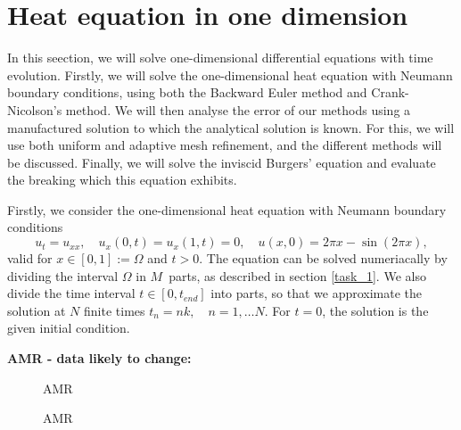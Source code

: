 \section{Heat equation in one dimension}
In this seection, we will solve one-dimensional differential equations with time evolution. 
Firstly, we will solve the one-dimensional heat equation with Neumann boundary conditions, using both the Backward Euler method and Crank-Nicolson's method.
We will then analyse the error of our methods using a manufactured solution to which the analytical solution is known.
For this, we will use both uniform and adaptive mesh refinement, and the different methods will be discussed.
Finally, we will solve the inviscid Burgers' equation and evaluate the breaking which this equation exhibits.

Firstly, we consider the one-dimensional heat equation with Neumann boundary conditions
\begin{equation*}
    u_t = u_{xx}, \quad u_x(0,t) = u_x(1,t) = 0, \quad u(x,0) = 2\pi x - \sin(2\pi x),
\end{equation*}
valid for $x \in [0,1] := \Omega$ and $t > 0$.
The equation can be solved numeriacally by dividing the interval $\Omega$ in $M$ parts, as described in section \ref{task_1}.
We also divide the time interval $t \in [0,t_{end}]$ into parts, so that we approximate the solution at $N$ finite times $t_n = nk, \quad n = 1, \ldots N$.
For $t = 0$, the solution is the given initial condition.


\begin{figure}[h]
    \centering
    
\end{figure}

\begin{figure}[h]
    \centering
    
\end{figure}

\begin{figure}[h]
    \centering
    
\end{figure}

\begin{figure}[h]
    \centering
    
\end{figure}

\textbf{AMR - data likely to change:}

\begin{figure}[h]
    \centering
    
    \caption{AMR}
\end{figure}

\begin{figure}[h]
    \centering
    
    \caption{AMR}
\end{figure}
